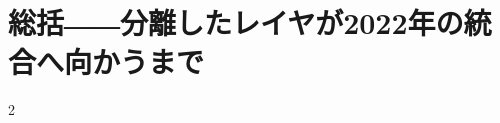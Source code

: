 \documentclass[lualatex,a4paper,11pt]{jlreq}
\begin{document}
\clearpage
\section{総括――分離したレイヤが2022年の統合へ向かうまで}
\label{pkg:synthesis-transition-2022}

\medskip
\begin{multicols}{2}

\end{multicols}


\clearpage
\printbibliography[title={References / Source Notes}]
\end{document}
